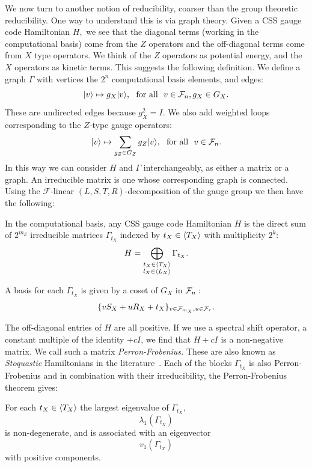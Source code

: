\documentclass[12pt]{article}
\newcommand{\Field}{\mathcal{F}}
\renewenvironment{framed}
{\begin{samepage}
\MakeFramed{\hsize0.8\linewidth\advance\hsize-\width\FrameRestore}}
{\endMakeFramed\end{samepage}}
\begin{document}
We now turn to another notion of reducibility, coarser than
the group theoretic reducibility.
One way to understand this is via graph theory.
Given a CSS gauge code Hamiltonian $H,$ 
we see that 
the diagonal terms (working in the computational basis)
come from the $Z$ operators and the off-diagonal terms
come from $X$ type operators.
We think of the $Z$ operators as potential energy, and the
$X$ operators as kinetic terms.
This suggests the following definition.
We define a graph $\Gamma$ with vertices the $2^n$ computational
basis elements, and edges:
$$
    \ket{v} \mapsto g_X \ket{v}, \smbox{for all} v\in\Fnd, g_X\in G_X.
$$
These are undirected edges because $g_X^2 = I.$
We also add weighted loops corresponding to the $Z$-type gauge operators:
$$
    \ket{v} \mapsto \sum_{g_Z\in G_Z} g_Z \ket{v}, \smbox{for all} v\in\Fnd.
$$
In this way we can consider $H$ and $\Gamma$ interchangeably,
as either a matrix or a graph.
An irreducible matrix is one whose corresponding graph is connected.
Using the $\Field$-linear $(L,S,T,R)$-decomposition of the gauge group
we then have the following:
\begin{framed}
\noindent In the computational basis, any CSS gauge code
Hamiltonian $H$ is the direct sum of $2^{m_Z}$
irreducible matrices $\Gamma_{t_X}$
indexed by $t_X\in\langle T_X \rangle$
with multiplicity $2^k$:
$$
    H = \bigoplus_{
    \substack{t_X\in\langle T_X \rangle\\l_X\in\langle L_X \rangle}}
        \Gamma_{t_X}.
$$
\end{framed}
A basis for each $\Gamma_{t_X}$ is given by a coset
of $G_X$ in $\Fnd:$
$$
    \{ v S_X + u R_X + t_X \}_{v\in \Field_{m_X}, u\in\Frd}.
$$


The off-diagonal entries of $H$ are all positive.
If we use a spectral shift operator, a constant multiple of the identity $+cI$,
we find that $H+cI$ is a non-negative matrix. 
We call such a matrix \emph{Perron-Frobenius.}
These are also known as \emph{Stoquastic} Hamiltonians
in the literature~\cite{Bravyi2008}.
Each of the blocks $\Gamma_{t_X}$ is also Perron-Frobenius
and in combination with their irreducibility, the Perron-Frobenius
theorem gives:
\begin{framed}
\noindent For each $t_X\in\langle T_X \rangle$
the largest eigenvalue 
of $\Gamma_{t_X},$
$$\lambda_1(\Gamma_{t_X})
$$
is non-degenerate,
and is associated with an eigenvector 
$$v_1(\Gamma_{t_X})
$$
with positive components.
\end{framed}
\end{document}
